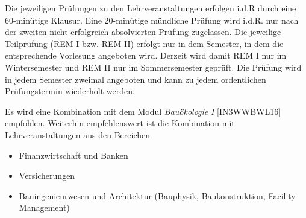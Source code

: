 \begin{course}

\setdoclanguagegerman
{}



\coursehead


\label{cour_6843.dp_997}


\begin{styleenv}
\begin{assessment}
Die jeweiligen Prüfungen zu den Lehrveranstaltungen erfolgen i.d.R durch eine 60-minütige Klausur. Eine 20-minütige mündliche Prüfung wird i.d.R. nur nach der zweiten nicht erfolgreich absolvierten Prüfung zugelassen. Die jeweilige Teilprüfung (REM I bzw. REM II) erfolgt nur in dem Semester, in dem die entsprechende Vorlesung angeboten wird. Derzeit wird damit REM I nur im Wintersemester und REM II nur im Sommersemester geprüft. Die Prüfung wird in jedem Semester zweimal angeboten und kann zu jedem ordentlichen Prüfungstermin wiederholt werden.


\end{assessment}

\begin{conditions}Es wird eine Kombination mit dem Modul \emph{Bauökologie} \emph{I} [IN3WWBWL16] empfohlen. Weiterhin empfehlenswert ist die Kombination mit Lehrveranstaltungen aus den Bereichen

 \begin{itemize}\item Finanzwirtschaft und Banken  \item Versicherungen  \item Bauingenieurwesen und Architektur (Bauphysik, Baukonstruktion, Facility Management)  \end{itemize}\end{conditions}


\end{styleenv}


\end{course}
